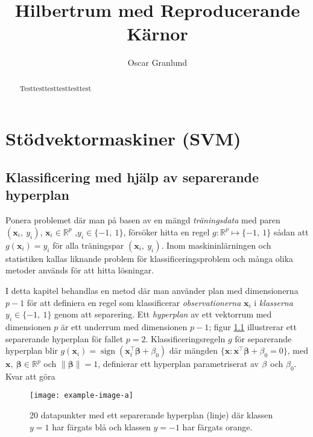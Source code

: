 \documentclass[a4paper, 12pt]{report}
\title{Hilbertrum med Reproducerande Kärnor}
\author{Oscar Granlund}
\DeclareMathOperator{\sign}{sign}
\begin{document}
\maketitle

\begin{abstract}
	Testtesttesttesttesttest
\end{abstract}

\chapter{Stödvektormaskiner (SVM)}

\section{Klassificering med hjälp av separerande hyperplan}
Ponera problemet där man på basen av en mängd \textit{träningsdata} med paren $(\mathbf{x}_i,~y_i)$, $\mathbf{x}_i\in\mathbb{R}^p$ ,$y_i\in \{-1,~1\}$, försöker hitta en regel $g: \mathbb{R}^p \longmapsto \{-1,~1\}$ sådan att $g(\mathbf{x}_i)=y_i$ för alla träningspar $(\mathbf{x}_i,~y_i)$. Inom maskininlärningen och statistiken kallas liknande problem för klassificeringsproblem och många olika metoder används för att hitta lösningar. 

I detta kapitel behandlas en metod där man använder plan med dimensionerna $p-1$ för att definiera en regel som klassificerar \textit{observationerna} $\mathbf{x}_i$ i \textit{klasserna} $y_i\in\{-1,~1\}$ genom att separering. Ett \textit{hyperplan} av ett vektorrum med dimensionen $p$ är ett underrum med dimensionen $p-1$; figur \ref{fig:separatinghyperplane} illustrerar ett separerande hyperplan för fallet $p=2$. Klassificeringsregeln $g$ för separerande hyperplan blir $g(\mathbf{x}_i)=\sign (\mathbf{x}_i^\intercal\boldsymbol{\beta} + \beta_0)$ där mängden $\{\mathbf{x}: \mathbf{x}^\intercal \boldsymbol{\beta} + \beta_0=0\}$, med $\mathbf{x},~\boldsymbol{\beta}\in \mathbb{R}^p$ och $\|\boldsymbol{\beta}\|=1$, definierar ett hyperplan parametriserat av $\boldmath\beta$ och $\beta_0$. Kvar att göra 

\begin{figure}
\centering
\texttt{[image: example-image-a]}
\caption{\label{fig:separatinghyperplane}20 datapunkter med ett separerande hyperplan (linje) där klassen $y=1$ har färgats blå och klassen $y=-1$ har färgats orange.}
\end{figure}
\end{document}
